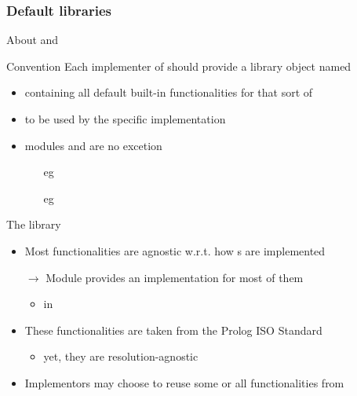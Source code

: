 \documentclass[handout]{beamer}
\begin{document}
\subsubsection{Default libraries}

\begin{frame}[allowframebreaks]{About  and }
    \begin{alertblock}{Convention}
        Each implementer of  should provide a library object named \alert{}
        \begin{itemize}
            \item containing all default built-in functionalities for that sort of 
            \item to be used by the specific  implementation
            \item modules  and  are no excetion
            \begin{itemize}
                \item[eg] 
                \item[eg]  
            \end{itemize}
        \end{itemize}
    \end{alertblock}

    \begin{block}{The  library}
        \begin{itemize}
            \item Most functionalities are \alert{agnostic} w.r.t. how s are implemented
            \item[$\rightarrow$] Module  provides an implementation for most of them
            \begin{itemize}
                \item in 
            \end{itemize} 
            \item These functionalities are taken from the Prolog ISO Standard \cite{prologISO-pt1}
            \begin{itemize}
                \item yet, they are \alert{resolution-agnostic}
            \end{itemize}
            \item Implementors may choose to reuse some or all functionalities from 
        \end{itemize}
    \end{block}


\end{frame}
\end{document}
